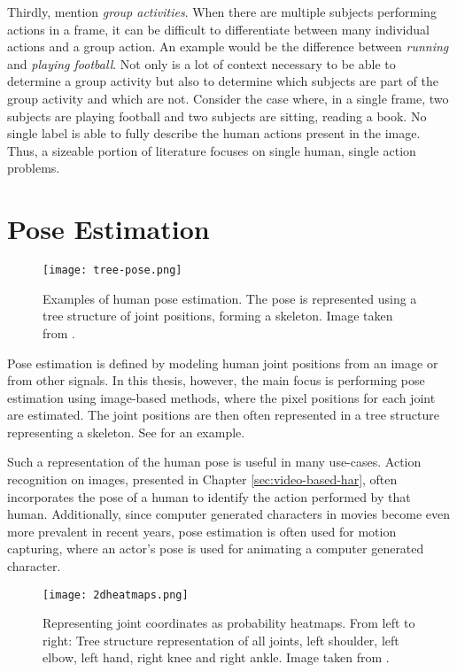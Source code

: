 Thirdly, \cite{zhang_review_2017} mention \textit{group activities}.
When there are multiple subjects performing actions in a frame, it can be difficult to differentiate between many individual actions and a group action.
An example would be the difference between \textit{running} and \textit{playing football}.
Not only is a lot of context necessary to be able to determine a group activity but also to determine which subjects are part of the group activity and which are not.
Consider the case where, in a single frame, two subjects are playing football and two subjects are sitting, reading a book.
No single label is able to fully describe the human actions present in the image.
Thus, a sizeable portion of literature focuses on single human, single action problems.

\section{Pose Estimation}

\begin{figure}[htb!]
    \centering
    \texttt{[image: tree-pose.png]}
    \caption{Examples of human pose estimation. The pose is represented using a tree structure of joint positions, forming a skeleton. Image taken from \cite{newell_stacked_2016}.}
    \label{fig:tree-skeleton}
\end{figure}

Pose estimation is defined by modeling human joint positions from an image or from other signals.
In this thesis, however, the main focus is performing pose estimation using image-based methods, where the pixel positions for each joint are estimated.
The joint positions are then often represented in a tree structure representing a skeleton.
See  for an example.

Such a representation of the human pose is useful in many use-cases.
Action recognition on images, presented in Chapter \ref{sec:video-based-har}, often incorporates the pose of a human to identify the action performed by that human.
Additionally, since computer generated characters in movies become even more prevalent in recent years, pose estimation is often used for motion capturing, where an actor's pose is used for animating a computer generated character.

\begin{figure}[htb!]
    \centering
    \texttt{[image: 2dheatmaps.png]}
    \caption{Representing joint coordinates as probability heatmaps. From left to right: Tree structure representation of all joints, left shoulder, left elbow, left hand, right knee and right ankle. Image taken from \cite{newell_stacked_2016}.}
    \label{fig:probability-heatmaps}
\end{figure}

